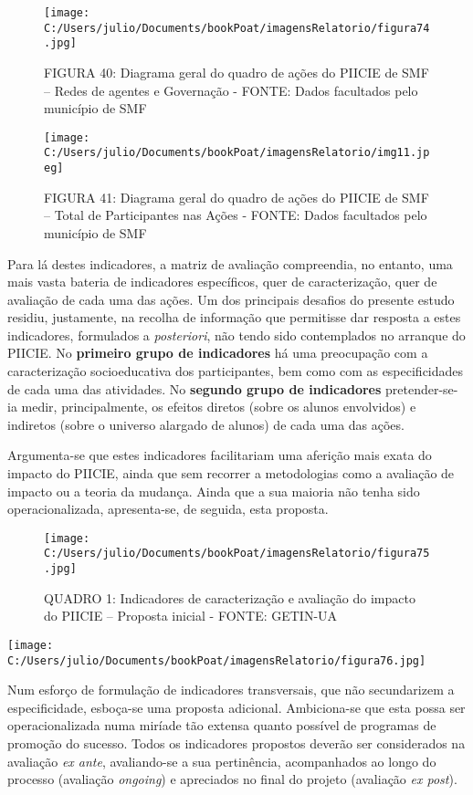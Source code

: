 \documentclass[
]{book}
\begin{document}
\begin{figure}
\centering
\texttt{[image: C:/Users/julio/Documents/bookPoat/imagensRelatorio/figura74.jpg]}
\caption{FIGURA 40: Diagrama geral do quadro de ações do PIICIE de SMF -- Redes de agentes e Governação - FONTE: Dados facultados pelo município de SMF}
\end{figure}

\begin{figure}
\centering
\texttt{[image: C:/Users/julio/Documents/bookPoat/imagensRelatorio/img11.jpeg]}
\caption{FIGURA 41: Diagrama geral do quadro de ações do PIICIE de SMF -- Total de Participantes nas Ações - FONTE: Dados facultados pelo município de SMF}
\end{figure}

Para lá destes indicadores, a matriz de avaliação compreendia, no entanto, uma mais vasta bateria de indicadores específicos, quer de caracterização, quer de avaliação de cada uma das ações. Um dos principais desafios do presente estudo residiu, justamente, na recolha de informação que permitisse dar resposta a estes indicadores, formulados a \emph{posteriori}, não tendo sido contemplados no arranque do PIICIE. No \textbf{primeiro grupo de indicadores} há uma preocupação com a caracterização socioeducativa dos participantes, bem como com as especificidades de cada uma das atividades. No \textbf{segundo grupo de indicadores} pretender-se-ia medir, principalmente, os efeitos diretos (sobre os alunos envolvidos) e indiretos (sobre o universo alargado de alunos) de cada uma das ações.

Argumenta-se que estes indicadores facilitariam uma aferição mais exata do impacto do PIICIE, ainda que sem recorrer a metodologias como a avaliação de impacto ou a teoria da mudança. Ainda que a sua maioria não tenha sido operacionalizada, apresenta-se, de seguida, esta proposta.

\begin{figure}
\centering
\texttt{[image: C:/Users/julio/Documents/bookPoat/imagensRelatorio/figura75.jpg]}
\caption{QUADRO 1: Indicadores de caracterização e avaliação do impacto do PIICIE -- Proposta inicial - FONTE: GETIN-UA}
\end{figure}

\texttt{[image: C:/Users/julio/Documents/bookPoat/imagensRelatorio/figura76.jpg]}

Num esforço de formulação de indicadores transversais, que não secundarizem a especificidade, esboça-se uma proposta adicional. Ambiciona-se que esta possa ser operacionalizada numa miríade tão extensa quanto possível de programas de promoção do sucesso. Todos os indicadores propostos deverão ser considerados na avaliação \emph{ex ante}, avaliando-se a sua pertinência, acompanhados ao longo do processo (avaliação \emph{ongoing}) e apreciados no final do projeto (avaliação \emph{ex post}).
\end{document}
